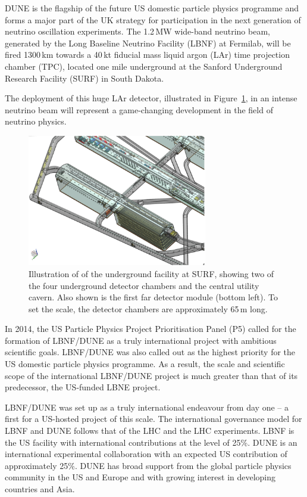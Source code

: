 DUNE is the flagship of the future US domestic particle physics programme and forms a major part of the UK strategy for participation in the next generation of neutrino oscillation experiments. The 1.2\,MW wide-band neutrino beam, generated by the Long Baseline Neutrino Facility (LBNF) at Fermilab, will be fired 1300\,km towards a 40\,kt fiducial mass liquid argon (LAr) time projection chamber (TPC),  located one mile underground at the Sanford Underground Research Facility (SURF) in South Dakota. 

The deployment of this huge LAr detector, illustrated in Figure~\ref{fig:dune:fardet1}, in an intense neutrino beam will represent a game-changing development in the field of neutrino physics. 

\begin{figure}[!htp]
\centerline{
\includegraphics[width=0.7\textwidth]{figs/DUNE_FD.png}
}
\caption[DUNE at SURF]{Illustration of of the underground facility at SURF, showing two of the four underground detector chambers and the central utility cavern. Also shown is the first far detector module (bottom left). To set the scale, the detector chambers are approximately 65\,m long. 
\label{fig:dune:fardet1}}
\end{figure}

In 2014, the US Particle Physics Project Prioritisation Panel (P5) called for the formation of LBNF/DUNE as a truly international project with ambitious scientific goals. LBNF/DUNE was also called out as the highest priority for the US domestic particle physics programme. As a result, the scale and scientific scope of the international LBNF/DUNE project is much greater than that of its predecessor, the US-funded LBNE project. 

LBNF/DUNE was set up as a truly international endeavour from day one -- a first for a US-hosted project of this scale. The international governance model for LBNF and DUNE follows that of the LHC and the LHC experiments. LBNF is the US facility with international contributions at the level of 25\%. DUNE is an international experimental collaboration with an expected US contribution of approximately 25\%. DUNE has broad support from the global particle physics community in the US and Europe and with growing interest in developing countries and Asia. 

